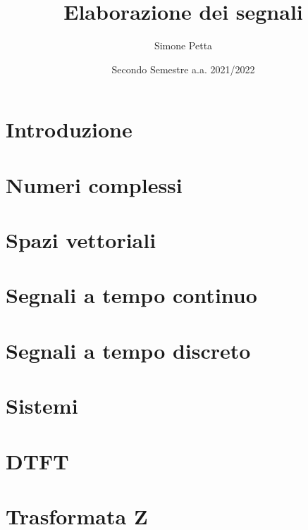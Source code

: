 \documentclass{book}
\title{Elaborazione dei segnali}
\author{Simone Petta}
\date{Secondo Semestre a.a. 2021/2022}
\begin{document}
\maketitle
\tableofcontents

\chapter{Introduzione}


\chapter{Numeri complessi}


\chapter{Spazi vettoriali}


\chapter{Segnali a tempo continuo}


\chapter{Segnali a tempo discreto}


\chapter{Sistemi}


\chapter{DTFT}


\chapter{Trasformata Z}

\end{document}
